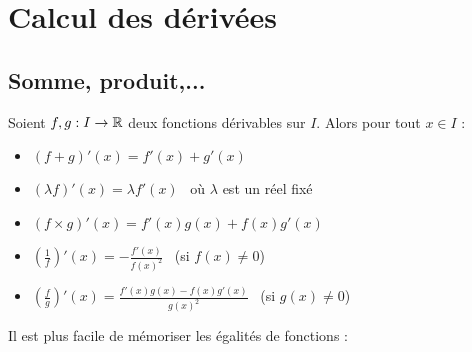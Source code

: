 \documentclass[class=report,crop=false]{standalone}
\begin{document}
\section{Calcul des dérivées}

\subsection{Somme, produit,...}


\begin{proposition}
Soient $f,g : I \to \mathbb{R}$ deux fonctions dérivables sur $I$. Alors pour tout $x \in I$ :
\begin{itemize}
  \item $(f+g)'(x) = f'(x)+g'(x)$
  \item $(\lambda f)'(x) = \lambda f'(x)$ \  où $\lambda$ est un réel fixé
  \item $(f \times g)'(x) = f'(x)g(x)+f(x)g'(x)$
  \item $\left(\frac{1}{f}\right)'(x)=-\frac{f'(x)}{f(x)^2}$ \   (si $f(x) \neq 0$)
  \item $\displaystyle\left(\frac{f}{g}\right)'(x)=\frac{f'(x)g(x)-f(x)g'(x)}{g(x)^2}$ \  (si $g(x) \neq 0$)
\end{itemize}
\end{proposition}

\begin{remarque*}
Il est plus facile de mémoriser les égalités de fonctions :
\end{remarque*}
\end{document}
